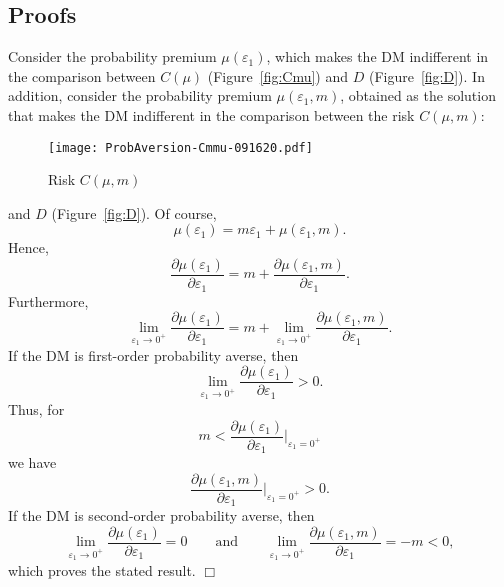 \documentclass[11pt]{article}
\def\qed{\unskip\nobreak\hfill$\Box$\par\addvspace{\medskipamount}}
\begin{document}
\begin{appendices}

\setcounter{equation}{0}

\section{Proofs}\label{sec:proofs}

Consider the probability premium $\mu(\varepsilon_{1})$,
which makes the DM indifferent in the comparison between $C(\mu)$ (Figure~\ref{fig:Cmu}) and $D$ (Figure~\ref{fig:D}).
In addition, consider the probability premium $\mu(\varepsilon_{1},m)$,
obtained as the solution that makes the DM indifferent in the comparison between the risk $C(\mu,m)$:
\vskip -0.5cm
\begin{figure}[H]
\begin{center}
\caption{Risk $C(\mu,m)$
}
\vskip 0.4cm
\texttt{[image: ProbAversion-Cmmu-091620.pdf]}
\label{fig:Cmmu}
\end{center}
\end{figure}
\noindent and $D$ (Figure~\ref{fig:D}).
Of course,
\begin{equation*}
\mu(\varepsilon_{1})=m\varepsilon_{1}+\mu(\varepsilon_{1},m).
\end{equation*}
Hence,
\begin{equation*}
\frac{\partial \mu(\varepsilon_{1})}{\partial \varepsilon_{1}}=m+\frac{\partial \mu(\varepsilon_{1},m)}{\partial \varepsilon_{1}}.
\end{equation*}
Furthermore,
\begin{equation*}
\lim_{\varepsilon_{1}\rightarrow 0^{+}}\frac{\partial \mu(\varepsilon_{1})}{\partial \varepsilon_{1}}
=m+\lim_{\varepsilon_{1}\rightarrow 0^{+}}\frac{\partial \mu(\varepsilon_{1},m)}{\partial \varepsilon_{1}}.
\end{equation*}
If the DM is first-order probability averse,
then
\begin{equation*}
\lim_{\varepsilon_{1}\rightarrow 0^{+}}\frac{\partial \mu(\varepsilon_{1})}{\partial \varepsilon_{1}}>0.
\end{equation*}
Thus, for
\begin{equation*}
m<\frac{\partial \mu(\varepsilon_{1})}{\partial \varepsilon_{1}}\Big|_{\varepsilon_{1}=0^{+}}
\end{equation*}
we have
\begin{equation*}
\frac{\partial \mu(\varepsilon_{1},m)}{\partial \varepsilon_{1}}\Big|_{\varepsilon_{1}=0^{+}}>0.
\end{equation*}
If the DM is second-order probability averse,
then
\begin{equation*}
\lim_{\varepsilon_{1}\rightarrow 0^{+}}\frac{\partial \mu(\varepsilon_{1})}{\partial \varepsilon_{1}}=0
\qquad\mathrm{and}\qquad
\lim_{\varepsilon_{1}\rightarrow 0^{+}}\frac{\partial \mu(\varepsilon_{1},m)}{\partial \varepsilon_{1}}=-m<0,
\end{equation*}
which proves the stated result.
\qed


\end{appendices}
\end{document}
